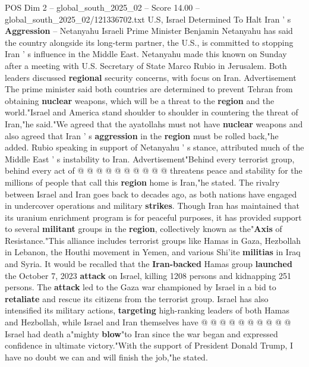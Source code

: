\begin{textsample}{POS Dim 2 – global\_south\_2025\_02 – Score 14.00 – global\_south\_2025\_02/121336702.txt}  \label{ex:f2_pos_372}
U.S, Israel Determined To Halt Iran ' s \textbf{Aggression} -- Netanyahu Israeli Prime Minister Benjamin Netanyahu has said the country alongside its long-term partner, the U.S., is committed to stopping Iran ' s influence in the Middle East.
Netanyahu made this known on Sunday after a meeting with U.S.
Secretary of State Marco Rubio in Jerusalem.
Both leaders discussed \textbf{regional} security concerns, with focus on Iran.
Advertisement The prime minister said both countries are determined to prevent Tehran from obtaining \textbf{nuclear} weapons, which will be a threat to the \textbf{region} and the world."Israel and America stand shoulder to shoulder in countering the threat of Iran,"he said."We agreed that the ayatollahs must not have \textbf{nuclear} weapons and also agreed that Iran ' s \textbf{aggression} in the \textbf{region} must be rolled back,"he added.
Rubio speaking in support of Netanyahu ' s stance, attributed much of the Middle East ' s instability to Iran.
Advertisement"Behind every terrorist group, behind every act of @ @ @ @ @ @ @ @ @ @ threatens peace and stability for the millions of people that call this \textbf{region} home is Iran,"he stated.
The rivalry between Israel and Iran goes back to decades ago, as both nations have engaged in undercover operations and military \textbf{strikes}.
Though Iran has maintained that its uranium enrichment program is for peaceful purposes, it has provided support to several \textbf{militant} groups in the \textbf{region}, collectively known as the"\textbf{Axis} of Resistance."This alliance includes terrorist groups like Hamas in Gaza, Hezbollah in Lebanon, the Houthi movement in Yemen, and various Shi'ite \textbf{militias} in Iraq and Syria.
It would be recalled that the \textbf{Iran-backed} Hamas group \textbf{launched} the October 7, 2023 \textbf{attack} on Israel, killing 1208 persons and kidnapping 251 persons.
The \textbf{attack} led to the Gaza war championed by Israel in a bid to \textbf{retaliate} and rescue its citizens from the terrorist group.
Israel has also intensified its military actions, \textbf{targeting} high-ranking leaders of both Hamas and Hezbollah, while Israel and Iran themselves have @ @ @ @ @ @ @ @ @ @ Israel had death a"mighty \textbf{blow}"to Iran since the war began and expressed confidence in ultimate victory."With the support of President Donald Trump, I have no doubt we can and will finish the job,"he stated.

\end{textsample}
